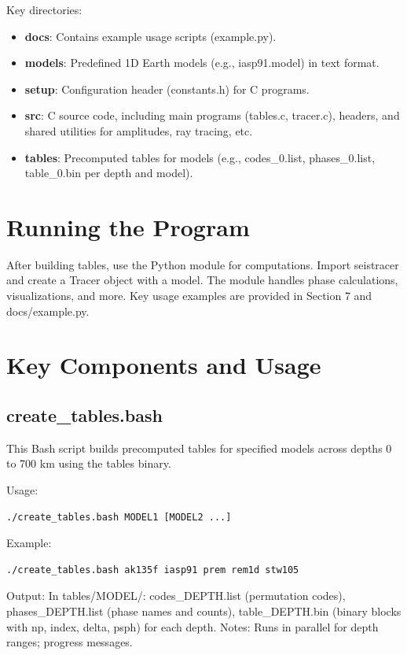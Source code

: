 \documentclass[12pt,a4paper]{article}
\begin{document}
Key directories:

\begin{itemize}
    \item \textbf{docs}: Contains example usage scripts (example.py).
    \item \textbf{models}: Predefined 1D Earth models (e.g., iasp91.model) in text format.
    \item \textbf{setup}: Configuration header (constants.h) for C programs.
    \item \textbf{src}: C source code, including main programs (tables.c, tracer.c), headers, and shared utilities for amplitudes, ray tracing, etc.
    \item \textbf{tables}: Precomputed tables for models (e.g., codes\_0.list, phases\_0.list, table\_0.bin per depth and model).
\end{itemize}

\section{Running the Program}
After building tables, use the Python module for computations. Import seistracer and create a Tracer object with a model. The module handles phase calculations, visualizations, and more.
Key usage examples are provided in Section 7 and docs/example.py.

\section{Key Components and Usage}
\subsection{create\_tables.bash}
This Bash script builds precomputed tables for specified models across depths 0 to 700 km using the tables binary.

Usage:

\begin{lstlisting}[language=Bash]
./create_tables.bash MODEL1 [MODEL2 ...]
\end{lstlisting}

Example:

\begin{lstlisting}[language=Bash]
./create_tables.bash ak135f iasp91 prem rem1d stw105
\end{lstlisting}

Output: In tables/MODEL/: codes\_DEPTH.list (permutation codes), phases\_DEPTH.list (phase names and counts), table\_DEPTH.bin (binary blocks with np, index, delta, psph) for each depth.
Notes: Runs in parallel for depth ranges; progress messages.
\end{document}
